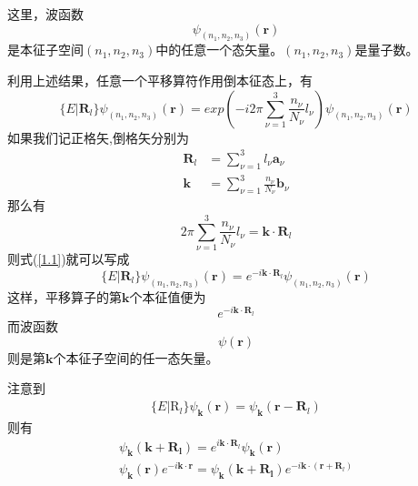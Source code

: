 这里，波函数
\begin{equation}
    \psi_{(n_1,n_2,n_3)}(\mathbf{r})
\end{equation}
是本征子空间$(n_1,n_2,n_3)$中的任意一个态矢量。$(n_1,n_2,n_3)$是量子数。
\par 利用上述结果，任意一个平移算符作用倒本征态上，有
\begin{equation}
    \{E|\mathbf{R}_l\}\psi_{(n_1,n_2,n_3)}(\mathbf{r}) = exp\left(
    -i2\pi \sum_{\nu = 1}^3 \frac{n_\nu}{N_\nu}l_\nu\right)\psi_{(n_1,n_2,n_3)}(\mathbf{r})
    \label{1.1}
\end{equation}
如果我们记正格矢,倒格矢分别为
\begin{align}
    \mathbf{R}_l &= \sum_{\nu =1 }^3 l_\nu \mathbf{a}_\nu \\
    \mathbf{k} &= \sum_{\nu = 1}^3 \frac{n_{\nu}}{N_\nu}\mathbf{b}_\nu
\end{align}
那么有
\begin{equation}
    2\pi \sum_{\nu = 1}^3 \frac{n_\nu}{N_\nu}l_\nu = \mathbf{k}\cdot \mathbf{R}_l
\end{equation}
则式(\ref{1.1})就可以写成
\begin{equation}
    \{E|\mathbf{R}_l\}\psi_{(n_1,n_2,n_3)}(\mathbf{r}) = e^{-i\mathbf{k}\cdot \mathbf{R}_l}\psi_{(n_1,n_2,n_3)}(\mathbf{r})
\end{equation}
这样，平移算子的第$\mathbf{k}$个本征值便为
\begin{equation}
    e^{-i\mathbf{k}\cdot \mathbf{R}_l}
\end{equation}
而波函数
\begin{equation}
    \psi (\mathbf{r})
\end{equation}
则是第$\mathbf{k}$个本征子空间的任一态矢量。
\par 注意到
\begin{equation}
\begin{aligned}
        \{E|\mathrm{R}_l\}\psi_\mathbf{k}(\mathbf{r}) = \psi_\mathbf{k}(\mathbf{r} - \mathbf{R}_l)
\end{aligned}
\end{equation}
则有
\begin{equation}
    \begin{aligned}
         \psi_\mathbf{k} (\mathbf{k + \mathbf{R}_l}) = e^{i\mathbf{k}\cdot \mathbf{R}_l}\psi_\mathbf{k}(\mathbf{r}) \\
         \psi_\mathbf{k}(\mathbf{r})e^{-i\mathbf{k}\cdot \mathbf{r}} = \psi_\mathbf{k} (\mathbf{k + \mathbf{R}_l}) e^{-i\mathbf{k}\cdot (\mathbf{r}+ \mathbf{R}_l)}
    \end{aligned}
\end{equation}
